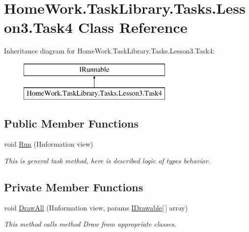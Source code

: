 \hypertarget{class_home_work_1_1_task_library_1_1_tasks_1_1_lesson3_1_1_task4}{}\section{Home\+Work.\+Task\+Library.\+Tasks.\+Lesson3.\+Task4 Class Reference}
\label{class_home_work_1_1_task_library_1_1_tasks_1_1_lesson3_1_1_task4}
Inheritance diagram for Home\+Work.\+Task\+Library.\+Tasks.\+Lesson3.\+Task4\+:\begin{figure}[H]
\begin{center}
\leavevmode
\includegraphics[height=2.000000cm]{class_home_work_1_1_task_library_1_1_tasks_1_1_lesson3_1_1_task4}
\end{center}
\end{figure}
\subsection*{Public Member Functions}
\begin{DoxyCompactItemize}
\item 
void \mbox{\hyperlink{class_home_work_1_1_task_library_1_1_tasks_1_1_lesson3_1_1_task4_aa77d09aeff9779960bd6a6cd8a0c02a8}{Run}} (I\+Information view)
\begin{DoxyCompactList}\small\item\em This is general task method, here is described logic of types behavior. \end{DoxyCompactList}\end{DoxyCompactItemize}
\subsection*{Private Member Functions}
\begin{DoxyCompactItemize}
\item 
void \mbox{\hyperlink{class_home_work_1_1_task_library_1_1_tasks_1_1_lesson3_1_1_task4_aafe53ff085465a81041b897adb29023d}{Draw\+All}} (I\+Information view, params \mbox{\hyperlink{interface_home_work_1_1_task_library_1_1_tasks_1_1_lesson3_1_1_interfaces_1_1_i_drawable}{I\+Drawable}}\mbox{[}$\,$\mbox{]} array)
\begin{DoxyCompactList}\small\item\em This method calls method Draw from appropriate classes. \end{DoxyCompactList}\end{DoxyCompactItemize}


